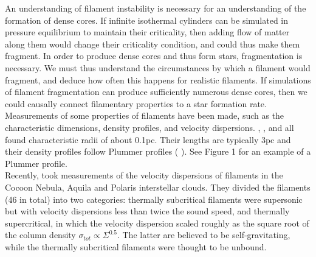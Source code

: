 \documentclass[a4paper,12pt]{article}
\begin{document}



An understanding of filament instability is necessary for an understanding of the formation of dense cores. If infinite isothermal cylinders can be simulated in pressure equilibrium to maintain their criticality, then adding flow of matter along them would change their criticality condition, and could thus make them fragment. In order to produce dense cores and thus form stars, fragmentation is necessary. We must thus understand the circumstances by which a filament would fragment, and deduce how often this happens for realistic filaments. If simulations of filament fragmentation can produce sufficiently numerous dense cores, then we could causally connect filamentary properties to a star formation rate.\\


Measurements of some properties of filaments have been made, such as the characteristic dimensions, density profiles, and velocity dispersions. \citep{fm12}, \citep{arz11}, \citep{pal13} and \citep{hen13} all found characteristic radii of about 0.1pc. Their lengths are typically 3pc \citep{and10} and their density profiles follow Plummer profiles (\citep{nut08} \citep{jml12} \citep{sgk14}). See Figure 1 for an example of a Plummer profile. \\


Recently, \cite{arz13} took measurements of the velocity dispersions of filaments in the Cocoon Nebula, Aquila and Polaris interstellar clouds. They divided the filaments (46 in total) into two categories: thermally subcritical filaments were supersonic but with velocity dispersions less than twice the sound speed, and thermally supercritical, in which the velocity dispersion scaled roughly as the square root of the column density $\sigma_{tot} \propto \Sigma^{0.5}$. The latter are believed to be self-gravitating, while the thermally subcritical filaments were thought to be unbound.\\
\end{document}
